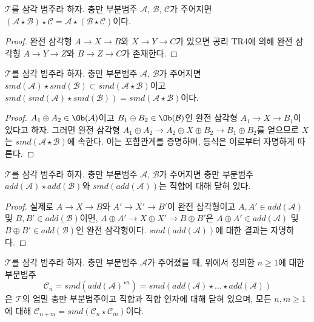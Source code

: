 \begin{lemma}
\label{lemma-associativity-star}
$\mathcal{T}$를 삼각 범주라 하자. 충만 부분범주
$\mathcal{A}$, $\mathcal{B}$, $\mathcal{C}$가 주어지면
$(\mathcal{A} \star \mathcal{B}) \star \mathcal{C} =
\mathcal{A} \star (\mathcal{B} \star \mathcal{C})$이다.
\end{lemma}

\begin{proof}
완전 삼각형 $A \to X \to B$와 $X \to Y \to C$가 있으면 공리 TR4에
의해 완전 삼각형 $A \to Y \to Z$와 $B \to Z \to C$가 존재한다.
\end{proof}

\begin{lemma}
\label{lemma-smd-star}
$\mathcal{T}$를 삼각 범주라 하자. 충만 부분범주
$\mathcal{A}$, $\mathcal{B}$가 주어지면
$smd(\mathcal{A}) \star smd(\mathcal{B}) \subset
smd(\mathcal{A} \star \mathcal{B})$이고
$smd(smd(\mathcal{A}) \star smd(\mathcal{B})) =
smd(\mathcal{A} \star \mathcal{B})$이다.
\end{lemma}

\begin{proof}
$A_1 \oplus A_2 \in \Ob(\mathcal{A})$이고
$B_1 \oplus B_2 \in \Ob(\mathcal{B})$인 완전 삼각형
$A_1 \to X \to B_1$이 있다고 하자. 그러면 완전 삼각형
$A_1 \oplus A_2 \to A_2 \oplus X \oplus B_2 \to B_1 \oplus B_2$를
얻으므로 $X$는 $smd(\mathcal{A} \star \mathcal{B})$에 속한다.
이는 포함관계를 증명하며, 등식은 이로부터 자명하게 따른다.
\end{proof}

\begin{lemma}
\label{lemma-add-star}
$\mathcal{T}$를 삼각 범주라 하자. 충만 부분범주
$\mathcal{A}$, $\mathcal{B}$가 주어지면 충만 부분범주
$add(\mathcal{A}) \star add(\mathcal{B})$와
$smd(add(\mathcal{A}))$는 직합에 대해 닫혀 있다.
\end{lemma}

\begin{proof}
실제로 $A \to X \to B$와 $A' \to X' \to B'$이 완전 삼각형이고
$A, A' \in add(\mathcal{A})$ 및 $B, B' \in add(\mathcal{B})$이면,
$A \oplus A' \to X \oplus X' \to B \oplus B'$은
$A \oplus A' \in add(\mathcal{A})$ 및
$B \oplus B' \in add(\mathcal{B})$인 완전 삼각형이다.
$smd(add(\mathcal{A}))$에 대한 결과는 자명하다.
\end{proof}

\begin{lemma}
\label{lemma-cone-n}
$\mathcal{T}$를 삼각 범주라 하자. 충만 부분범주 $\mathcal{A}$가
주어졌을 때, 위에서 정의한 $n \geq 1$에 대한 부분범주
$$
\mathcal{C}_n = smd(add(\mathcal{A})^{\star n}) =
smd(add(\mathcal{A}) \star \ldots \star add(\mathcal{A}))
$$
은 $\mathcal{T}$의 엄밀 충만 부분범주이고 직합과 직합 인자에 대해
닫혀 있으며, 모든 $n, m \geq 1$에 대해
$\mathcal{C}_{n + m} = smd(\mathcal{C}_n \star \mathcal{C}_m)$이다.
\end{lemma}

